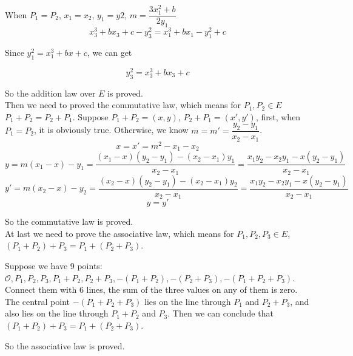 \documentclass{article}
\begin{document}
When $P_1=P_2$, $x_1=x_2$, $y_1=y2$, $m=\dfrac{3x_1^2+b}{2y_1}$
$$x_3^3+bx_3+c-y_3^2=x_1^3 + bx_1 - y_1^2 + c$$

Since $y_1^2=x_1^3+bx+c$, we can get

$$y_3^2=x_3^3+bx_3+c$$

So the addition law over $E$ is proved.\\

Then we need to proved the commutative law, which means for $P_1,P_2\in E$ $P_1+P_2=P_2+P_1$. Suppose $P_1+P_2=(x,y)$, $P_2+P_1=(x',y')$, 
first, when $P_1=P_2$, it is obviously true. Otherwise, we know $m=m'=\dfrac{y_2-y_1}{x_2-x_1}$.
$$x=x'=m^2-x_1-x_2$$
$$y=m(x_1-x)-y_1=\frac{(x_1-x)(y_2-y_1)-(x_2-x_1)y_1}{x_2-x_1}=\frac{x_1y_2-x_2y_1-x(y_2-y_1)}{x_2-x_1}$$
$$y'=m(x_2-x)-y_2=\frac{(x_2-x)(y_2-y_1)-(x_2-x_1)y_2}{x_2-x_1}=\frac{x_1y_2-x_2y_1-x(y_2-y_1)}{x_2-x_1}$$
$$y=y'$$

So the commutative law is proved. \\

At last we need to prove the associative law, which means for $P_1,P_2,P_3\in E$, $(P_1+P_2)+P_3=P_1+(P_2+P_3)$.

Suppose we have 9 points: $\mathcal{O},P_1,P_2,P_3,P_1+P_2,P_2+P_3,-(P_1+P_2),-(P_2+P_3),-(P_1+P_2+P_3)$. Connect them with 6 lines, the sum of the three values on any of them is zero. The central point $-(P_1+P_2+P_3)$ lies on the line through $P_1$ and $P_2+P_3$, and also lies on the line through $P_1+P_2$ and $P_3$. Then we can conclude that 
$(P_1+P_2)+P_3=P_1+(P_2+P_3)$.

So the associative law is proved.
\end{document}
